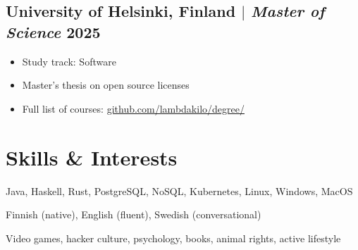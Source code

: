 \documentclass[12pt]{article} %
\begin{document}
\subsection{University of Helsinki, Finland $|$ {\normalfont\itshape Master of Science} \hfill 2025}
\begin{itemize}
  \item Study track: Software
  \item Master's thesis on open source licenses
  \item Full list of courses: \href{https://github.com/lambdakilo/degree/}{github.com/lambdakilo/degree/}
\end{itemize}

\section{Skills \& Interests}
\begin{description}[itemsep=0pt]
  \item[Technical] Java, Haskell, Rust, PostgreSQL, NoSQL, Kubernetes, Linux, Windows, MacOS
  \item[Language] Finnish (native), English (fluent), Swedish (conversational)
  \item[Interests] Video games, hacker culture, psychology, books, animal rights, active lifestyle
\end{description}
\end{document}
